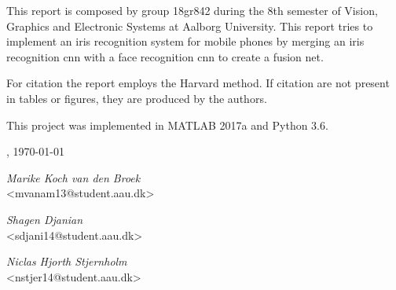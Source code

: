 This report is composed by group 18gr842 during the 8th semester of Vision, Graphics and Electronic Systems at Aalborg University. This report tries to implement an iris recognition system for mobile phones by merging an iris recognition \gls{cnn} with a face recognition \gls{cnn} to create a fusion net. 

For citation the report employs the Harvard method. If citation are not present in tables or figures, they are produced by the authors. 

This project was implemented in MATLAB 2017a and Python 3.6. 

\vspace{\baselineskip}\hfill \AAU, \today
\vfill\noindent
\begin{center}
\begin{minipage}[b]{0.45\textwidth}
 \centering
  \textit{Marike Koch van den Broek}\\
  {\footnotesize <mvanam13@student.aau.dk>}
\end{minipage}
\begin{minipage}[b]{0.45\textwidth}
	\centering
	\textit{Shagen Djanian}\\
	{\footnotesize <sdjani14@student.aau.dk>}
\end{minipage}
\hspace{0.3cm}
\vspace{1\baselineskip}

\begin{minipage}[b]{0.45\textwidth}
	\centering
	\textit{Niclas Hjorth Stjernholm}\\
	{\footnotesize <nstjer14@student.aau.dk>}
\end{minipage}

\end{center}

